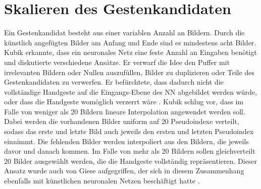 \section{Skalieren des Gestenkandidaten}
\label{sec:scaling}
Ein Gestenkandidat besteht aus einer variablen Anzahl an Bildern. Durch die künstlich angefügten Bilder am Anfang und Ende sind es mindestens acht Bilder. Kubik erkannte, dass ein neuronales Netz eine feste Anzahl an
Eingaben benötigt und diskutierte verschiedene Ansätze. Er verwarf die Idee den Puffer mit irrelevanten Bildern oder Nullen auszufüllen, Bilder zu duplizieren oder Teile des Gestenkandidaten zu verwerfen. Er
befürchtete, dass dadurch nicht die vollständige Handgeste auf die Eingangs-Ebene des NN abgebildet werden würde, oder dass die Handgeste womöglich verzerrt wäre \cite{kubikThesis}.
\newline
\newline
Kubik schlug vor, dass im Falle von weniger als 20 Bildern lineare Interpolation angewendet werden soll. Dabei werden die vorhandenen Bilder uniform auf 20 Pseudoindexe verteilt, sodass das erste und letzte Bild auch
jeweils den ersten und letzten Pseudoindex einnimmt. Die fehlenden Bilder werden interpoliert aus den Bildern, die jeweils davor und danach kommen.
\newline
\newline
Im Falle von mehr als 20 Bildern sollen gleichverteilt 20 Bilder ausgewählt werden, die die Handgeste vollständig repräsentieren. Dieser Ansatz wurde auch von Giese aufgegriffen, der sich in diesem Zusammenhang
ebenfalls mit künstlichen neuronalen Netzen beschäftigt hatte \cite{gieseThesis}.